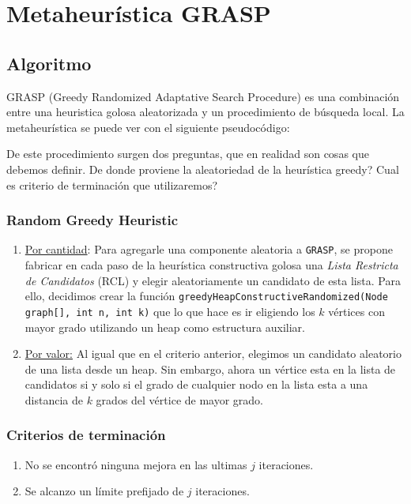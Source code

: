 \section{Metaheurística GRASP}

\subsection{Algoritmo}

GRASP (Greedy Randomized Adaptative Search Procedure) es una combinación entre una heuristica golosa aleatorizada y un procedimiento de búsqueda local. La metaheurística se puede ver con el siguiente pseudocódigo:

\begin{algorithmic}
	\EndIf
\EndWhile
\EndProcedure
\end{algorithmic}

De este procedimiento surgen dos preguntas, que en realidad son cosas que debemos definir. De donde proviene la aleatoriedad de la heurística greedy? Cual es criterio de terminación que utilizaremos?

\subsubsection{Random Greedy Heuristic}

\begin{enumerate}
\item \underline{Por cantidad}:
Para agregarle una componente aleatoria a \texttt{GRASP}, se propone fabricar en cada paso de la heurística constructiva golosa una \textit{Lista Restricta de Candidatos} (RCL) y elegir aleatoriamente un candidato de esta lista. Para ello, decidimos crear la función \texttt{greedyHeapConstructiveRandomized(Node graph[], int n, int k)} que lo que hace es ir eligiendo los $k$ vértices con mayor grado utilizando un heap como estructura auxiliar.
\item \underline{Por valor:} Al igual que en el criterio anterior, elegimos un candidato aleatorio de una lista desde un heap. Sin embargo, ahora un vértice esta en la lista de candidatos si y solo si el grado de cualquier nodo en la lista esta a una distancia de $k$ grados del vértice de mayor grado.
\end{enumerate}

\subsubsection{Criterios de terminación}
\begin{enumerate}
\item No se encontró ninguna mejora en las ultimas $j$ iteraciones.
\item Se alcanzo un límite prefijado de  $j$ iteraciones.
\end{enumerate}